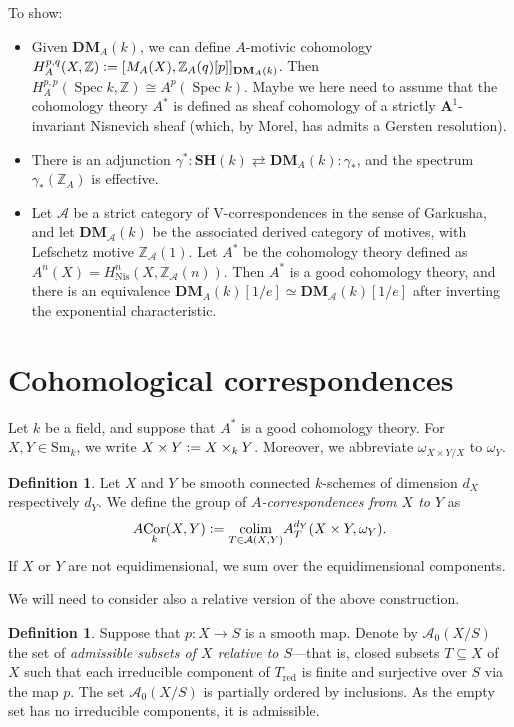 \documentclass[a4paper, oneside, english,reqno]{amsart}
\theoremstyle{plain}
\theoremstyle{definition}
\newtheorem{definition}[theorem]{Definition}
\theoremstyle{remark}
\newcommand{\defeq}{\vcentcolon=}
\newcommand{\Nis}{\mathrm{Nis}}
\newcommand{\ACor}{A\mkern-3mu\Cor}
\newcommand{\A}{\mathbf{A}}
\newcommand{\calA}{\mathcal{A}}
\newcommand{\DM}{\mathbf{DM}}
\newcommand{\Sm}{\mathrm{Sm}}
\newcommand{\SH}{\mathbf{SH}}
\newcommand{\red}{\mathrm{red}}
\newcommand{\DMA}{{\mathbf{DM}}_A}
\DeclareMathOperator{\Spec}{Spec}
\DeclareMathOperator{\Cor}{Cor}
\DeclareMathOperator{\colim}{colim}
\begin{document}
To show:
\begin{itemize}
\item Given $\DMA(k)$, we can define $A$-motivic cohomology $H_A^{p,q}(X,\mathbb{Z})\defeq[M_A(X),\mathbb{Z}_A(q)[p]]_{\DMA(k)}$. Then $H_A^{p,p}(\Spec k,\mathbb{Z})\cong A^p(\Spec k)$. Maybe we here need to assume that the cohomology theory $A^*$ is defined as sheaf cohomology of a strictly $\A^1$-invariant Nisnevich sheaf (which, by Morel, has admits a Gersten resolution).
\item There is an adjunction $\gamma^*: \SH(k)\rightleftarrows \DMA(k):\gamma_*$, and the spectrum $\gamma_*(\mathbb{Z}_A)$ is effective.
\item Let $\mathscr{A}$ be a strict category of V-correspondences in the sense of Garkusha, and let $\DM_{\mathscr{A}}(k)$ be the associated derived category of motives, with Lefschetz motive $\mathbb{Z}_{\mathscr{A}}(1)$. Let $A^*$ be the cohomology theory defined as $A^n(X)=H^n_{\Nis}(X,\mathbb{Z}_{\mathscr{A}}(n))$. Then $A^*$ is a good cohomology theory, and there is an equivalence $\DMA(k)[1/e]\simeq\DM_{\mathscr{A}}(k)[1/e]$ after inverting the exponential characteristic.
\end{itemize}

\section{Cohomological correspondences}

Let $k$ be a field, and suppose that $A^*$ is a good cohomology theory. For $X,Y\in\Sm_k$, we write $X\times Y\defeq X\times_k Y$. Moreover, we abbreviate $\omega_{X\times Y/X}$ to $\omega_Y$.

\begin{definition}
Let $X$ and $Y$ be smooth connected $k$-schemes of dimension $d_X$ respectively $d_Y$. We define the group of \emph{$A$-correspondences from $X$ to $Y$} as
\[
\ACor_k(X,Y)\defeq\underset{T\in\calA(X,Y)}{\colim}A_T^{d_Y}(X\times Y,\omega_{Y}).
\]
If $X$ or $Y$ are not equidimensional, we sum over the equidimensional components.
\end{definition}

We will need to consider also a relative version of the above construction.

\begin{definition}
Suppose that $p\colon X\to S$ is a smooth map. Denote by $\calA_0(X/S)$ the set of \emph{admissible subsets of $X$ relative to $S$}---that is, closed subsets $T\subseteq X$ of $X$ such that each irreducible component of $T_\red$ is finite and surjective over $S$ via the map $p$. The set $\calA_0(X/S)$ is partially ordered by inclusions. As the empty set has no irreducible components, it is admissible.
\end{definition}
\end{document}

